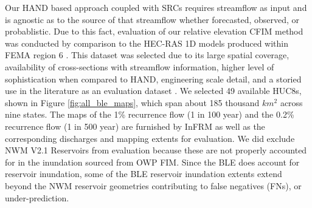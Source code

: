 Our HAND based approach coupled with SRCs requires streamflow as input and is agnostic as to the source of that streamflow whether forecasted, observed, or probablistic.
Due to this fact, evaluation of our relative elevation CFIM method was conducted by comparison to the HEC-RAS 1D models produced within FEMA region 6 \cite{fema2021base,fema2021estimated,us2022hydrologic}.
This dataset was selected due to its large spatial coverage, availability of cross-sections with streamflow information, higher level of sophistication when compared to HAND, engineering scale detail, and a storied use in the literature as an evaluation dataset \cite{cook2009effect,rajib2016large,zheng2018geoflood,afshari2018comparison,wing2017validation,criss2022stage,follum2017autorapid,bates201630m,wing2017validation,hu2021real,li2022accounting,li2022comprehensive,zheng2018geoflood}.
We selected 49 available HUC8s, shown in Figure \ref{fig:all_ble_maps}, which span about 185 thousand $km^2$ across nine states.
The maps of the 1\% recurrence flow (1 in 100 year) and the 0.2\% recurrence flow (1 in 500 year) are furnished by InFRM as well as the corresponding discharges and mapping extents for evaluation.
We did exclude NWM V2.1 Reservoirs from evaluation because these are not properly accounted for in the inundation sourced from OWP FIM.
Since the BLE does account for reservoir inundation, some of the BLE reservoir inundation extents extend beyond the NWM reservoir geometries contributing to false negatives (FNs), or under-prediction.

